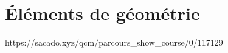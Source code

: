 

% 
% 


% 




\chapter{Éléments de géométrie}
{https://sacado.xyz/qcm/parcours_show_course/0/117129}

